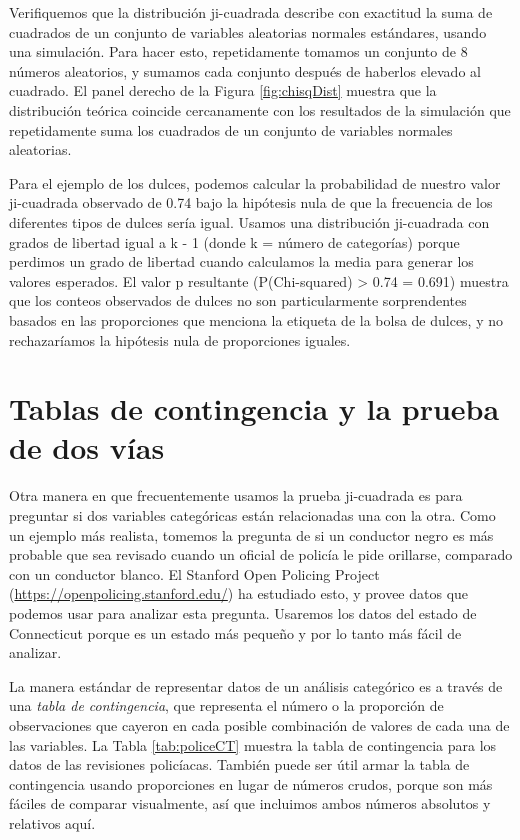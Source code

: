 \documentclass[
  12pt,
]{book}
\begin{document}
Verifiquemos que la distribución ji-cuadrada describe con exactitud la suma de cuadrados de un conjunto de variables aleatorias normales estándares, usando una simulación. Para hacer esto, repetidamente tomamos un conjunto de 8 números aleatorios, y sumamos cada conjunto después de haberlos elevado al cuadrado. El panel derecho de la Figura \ref{fig:chisqDist} muestra que la distribución teórica coincide cercanamente con los resultados de la simulación que repetidamente suma los cuadrados de un conjunto de variables normales aleatorias.

Para el ejemplo de los dulces, podemos calcular la probabilidad de nuestro valor ji-cuadrada observado de 0.74 bajo la hipótesis nula de que la frecuencia de los diferentes tipos de dulces sería igual. Usamos una distribución ji-cuadrada con grados de libertad igual a k - 1 (donde k = número de categorías) porque perdimos un grado de libertad cuando calculamos la media para generar los valores esperados. El valor p resultante (P(Chi-squared) \textgreater{} 0.74 = 0.691) muestra que los conteos observados de dulces no son particularmente sorprendentes basados en las proporciones que menciona la etiqueta de la bolsa de dulces, y no rechazaríamos la hipótesis nula de proporciones iguales.

\hypertarget{two-way-test}{%
\section{Tablas de contingencia y la prueba de dos vías}\label{two-way-test}}

Otra manera en que frecuentemente usamos la prueba ji-cuadrada es para preguntar si dos variables categóricas están relacionadas una con la otra. Como un ejemplo más realista, tomemos la pregunta de si un conductor negro es más probable que sea revisado cuando un oficial de policía le pide orillarse, comparado con un conductor blanco. El Stanford Open Policing Project (\url{https://openpolicing.stanford.edu/}) ha estudiado esto, y provee datos que podemos usar para analizar esta pregunta. Usaremos los datos del estado de Connecticut porque es un estado más pequeño y por lo tanto más fácil de analizar.

La manera estándar de representar datos de un análisis categórico es a través de una \emph{tabla de contingencia}, que representa el número o la proporción de observaciones que cayeron en cada posible combinación de valores de cada una de las variables. La Tabla \ref{tab:policeCT} muestra la tabla de contingencia para los datos de las revisiones policíacas. También puede ser útil armar la tabla de contingencia usando proporciones en lugar de números crudos, porque son más fáciles de comparar visualmente, así que incluimos ambos números absolutos y relativos aquí.
\end{document}
